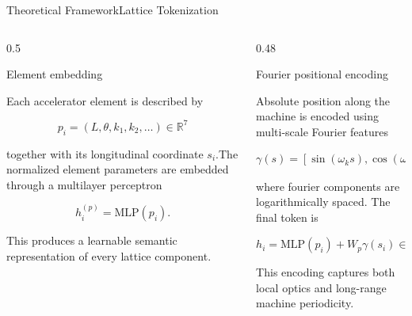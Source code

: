 \documentclass[aspectratio=169,t,11pt,table]{beamer}
{\setbeamercovered{transparent}}
\begin{document}
\begin{frame}{Theoretical Framework}{Lattice Tokenization}

\vspace{-0.7cm}

\begin{columns}[T]

\begin{column}{0.5\textwidth}

\begin{purpleBlock}{\centering\small{Element embedding}}

\tiny

Each accelerator element is described by

\[
p_i=
(L,\theta,k_1,k_2,\ldots)
\in\mathbb R^7
\]

together with its longitudinal coordinate $s_i$.The normalized element parameters are embedded through a multilayer perceptron

\[
h_i^{(p)}
=
\mathrm{MLP}(p_i).
\]

This produces a learnable semantic representation of every lattice component.

\end{purpleBlock}

\end{column}

\hfill

\begin{column}{0.48\textwidth}

\begin{purpleBlock}{\centering\small{Fourier positional encoding}}

\tiny

Absolute position along the machine is encoded using multi-scale Fourier features

\[
\gamma(s)
=
\left[
\sin(\omega_ks),
\cos(\omega_ks)
\right]_{k=1}^{32},
\]

where fourier components are logarithmically spaced. The final token is

\[
h_i
=
\mathrm{MLP}(p_i)
+
W_p\gamma(s_i)
\in\mathbb R^{512}.
\]

This encoding captures both local optics and long-range machine periodicity.

\end{purpleBlock}

\end{column}

\end{columns}

\end{frame}
\end{document}
